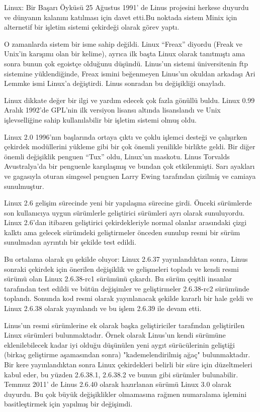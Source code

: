 \begin{section}{Linux: Bir Başarı Öyküsü}
25 Ağustus 1991’ de Linus projesini herkese duyurdu ve dünyanın kalanını katılması için davet etti.Bu noktada sistem Minix için alternetif bir işletim sistemi çekirdeği olarak görev yaptı.

O zamanlarda sistem bir isme sahip değildi. Linux “Freax” diyordu (Freak ve Unix'in karışımı olan bir kelime), ayrıca ilk başta Linux olarak tanıtmıştı ama sonra bunun çok egoistçe olduğunu düşündü. Linus’un sistemi üniversitenin ftp sistemine yüklendiğinde, Freax ismini beğenmeyen Linus’un okuldan arkadaşı Ari Lemmke ismi Linux’a değiştirdi. Linus sonradan bu değişikliği onayladı.

Linux dikkate değer bir ilgi ve yardım edecek çok fazla gönüllü buldu. Linux 0.99 Aralık 1992'de GPL'nin ilk versiyon lisansı altında lisanslandı ve Unix işlevselliğine sahip kullanılabilir bir işletim sistemi olmuş oldu.

Linux 2.0 1996'nın başlarında ortaya çıktı ve çoklu işlemci desteği ve çalışırken çekirdek modüllerini yükleme gibi bir çok önemli yenilikle birlikte geldi. Bir diğer önemli değişiklik penguen “Tux” oldu, Linux’un maskotu. Linus Torvalds Avustralya’da bir penguenle karşılaşmış ve bundan çok etkilenmişti. Sarı ayakları ve gagasıyla oturan simgesel penguen Larry Ewing tarafından çizilmiş ve camiaya sunulmuştur.

Linux 2.6 gelişim sürecinde yeni bir yapılaşma sürecine girdi. Önceki sürümlerde son kullanıcıya uygun sürümlerle geliştirici sürümleri ayrı olarak sunuluyordu. Linux 2.6'dan itibaren geliştirici çekirdekleriyle normal olanlar arasındaki çizgi kalktı ama gelecek sürümdeki geliştirmeler önceden sunulup resmi bir sürüm sunulmadan ayrıntılı bir şekilde test edildi.

Bu ortalama olarak şu şekilde oluyor: Linux 2.6.37 yayınlandıktan sonra, Linus sonraki çekirdek için önerilen değişiklik ve gelişmeleri topladı ve kendi resmi sürümü olan Linux 2.6.38-rc1 sürümünü çıkardı. Bu sürüm çeşitli insanlar tarafından test edildi ve bütün değişimler ve geliştirmeler 2.6.38-rc2 sürümünde toplandı. Sonunda kod resmi olarak yayınlanacak şekilde kararlı bir hale geldi ve Linux 2.6.38 olarak yayınlandı ve bu işlem 2.6.39 ile devam etti.

Linus’un resmi sürümlerine ek olarak başka geliştiriciler tarafından geliştirilen Linux sürümleri bulunmaktadır. Örnek olarak Linus'un kendi sürümüne eklenilebilecek kadar iyi olduğu düşünülen yeni aygıt sürücülerinin geliştiği (birkaç geliştirme aşamasından sonra) "kademelendirilmiş ağaç" bulunmaktadır. Bir kere yayınlandıktan sonra Linux çekirdekleri belirli bir süre için düzeltmeleri kabul eder, bu yüzden 2.6.38.1, 2.6.38.2 ve bunun gibi sürümler bulunabilir. Temmuz 2011’ de Linus 2.6.40 olarak hazırlanan sürümü Linux 3.0 olarak duyurdu. Bu çok büyük değişiklikler olmamasına rağmen numaralama işlemini basitleştirmek için yapılmış bir değişimdi.


\end{section}
